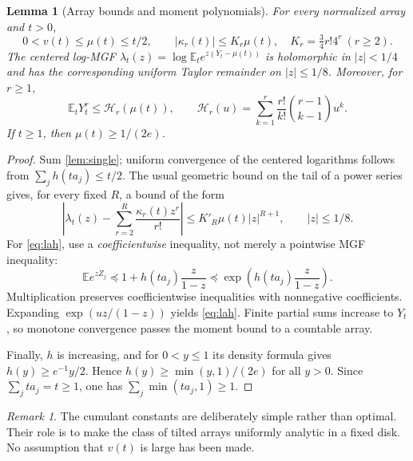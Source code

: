 \documentclass[11pt,a4paper]{article}
\numberwithin{equation}{section}
\newtheorem{lemma}[theorem]{Lemma}
\theoremstyle{definition}\newtheorem{definition}[theorem]{Definition}
\theoremstyle{remark}\newtheorem{remark}[theorem]{Remark}
\newcommand{\E}{\mathbb E}
\newcommand{\Lah}{\mathcal H}
\begin{document}
\begin{lemma}[Array bounds and moment polynomials]\label{lem:array}
For every normalized array and $t>0$,
\begin{equation}\label{eq:arraybounds}
 0<v(t)\le\mu(t)\le t/2,\qquad
 |\kappa_r(t)|\le K_r\mu(t),\quad K_r=\tfrac34r!4^r\ (r\ge2).
\end{equation}
The centered log-MGF $\lambda_t(z)=\log\E_t e^{z(Y_t-\mu(t))}$ is holomorphic in $|z|<1/4$ and has the corresponding uniform Taylor remainder on $|z|\le1/8$.
Moreover, for $r\ge1$,
\begin{equation}\label{eq:lah}
 \E_tY_t^r\le\Lah_r(\mu(t)),\qquad
 \Lah_r(u)=\sum_{k=1}^{r}\frac{r!}{k!}\binom{r-1}{k-1}u^k.
\end{equation}
If $t\ge1$, then $\mu(t)\ge1/(2e)$.
\end{lemma}
\begin{proof}
Sum \cref{lem:single}; uniform convergence of the centered logarithms follows from $\sum_j h(ta_j)\le t/2$. The usual geometric bound on the tail of a power series gives, for every fixed $R$, a bound of the form
\[
 \left|\lambda_t(z)-\sum_{r=2}^{R}\frac{\kappa_r(t)z^r}{r!}\right|
 \le K'_R\mu(t)|z|^{R+1},\qquad |z|\le1/8.
\]
For \eqref{eq:lah}, use a \emph{coefficientwise} inequality, not merely a pointwise MGF inequality:
\[
 \E e^{zZ_j}\preccurlyeq1+h(ta_j)\frac{z}{1-z}
 \preccurlyeq\exp\!\left(h(ta_j)\frac{z}{1-z}\right).
\]
Multiplication preserves coefficientwise inequalities with nonnegative coefficients. Expanding $\exp(uz/(1-z))$ yields \eqref{eq:lah}. Finite partial sums increase to $Y_t$, so monotone convergence passes the moment bound to a countable array.

Finally, $h$ is increasing, and for $0<y\le1$ its density formula gives
$h(y)\ge e^{-1}y/2$. Hence $h(y)\ge\min(y,1)/(2e)$ for all $y>0$.
Since $\sum_jta_j=t\ge1$, one has $\sum_j\min(ta_j,1)\ge1$.
\end{proof}

\begin{remark}
The cumulant constants are deliberately simple rather than optimal. Their role is to make the class of tilted arrays uniformly analytic in a fixed disk. No assumption that $v(t)$ is large has been made.
\end{remark}
\end{document}
